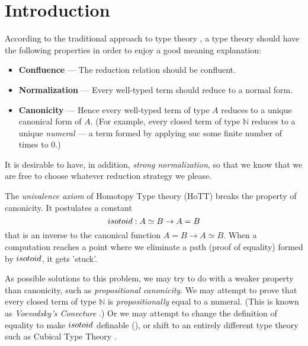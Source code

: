 \usepackage{amsmath}
\usepackage{amssymb}
\usepackage{autofe}
\usepackage{bbm}
\usepackage[greek,english]{babel}
\usepackage{etex}
\usepackage{framed}
\usepackage[utf8x]{inputenc}
\usepackage{proof}
\usepackage{stmaryrd}
\usepackage{suffix}
\usepackage{textalpha}
\usepackage{todo}
\usepackage{ucs}



\newcommand{\AgdaHide}[1]{}



\maketitle

\section{Introduction}

According to the traditional approach to type theory , a type theory should have the
following properties in order to enjoy a good meaning explanation:
\begin{itemize}
\item \textbf{Confluence} --- The reduction relation should be confluent.
\item \textbf{Normalization} --- Every well-typed term should reduce to a normal form.
\item \textbf{Canonicity} --- Hence every well-typed term of type $A$ reduces to a unique canonical form of $A$.  (For example,
every closed term of type $\mathbb{N}$ reduces to a unique \emph{numeral} --- a term formed by applying $\mathrm{suc}$ some
finite number of times to 0.)
\end{itemize}

It is desirable to have, in addition, \emph{strong normalization}, so that we know that we are free to choose whatever reduction strategy we please.

The \emph{univalence axiom} of Homotopy Type theory (HoTT)  breaks the property of canonicity.  It postulates a
constant
\[ isotoid : A \simeq B \rightarrow A = B \]
that is an inverse to the canonical function $A = B \rightarrow A \simeq B$.  When a computation reaches a point
where we eliminate a path (proof of equality) formed by $isotoid$, it gets 'stuck'.

As possible solutions to this problem, we may try to do with a weaker property than canonicity, such as \emph{propositional canonicity}.
We may attempt to prove that every closed term of type $\mathbb{N}$ is \emph{propositionally} equal to a numeral.  (This is known as
\emph{Voevodsky's Conecture} .)  Or we may attempt to change the definition of equality to make $isotoid$ definable (\cite{Polonsky14a}), or
shift to an entirely different type theory such as Cubical Type Theory .

